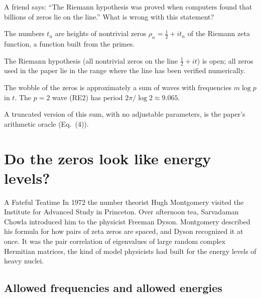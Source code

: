 \begin{checkpoint}
A friend says: ``The Riemann hypothesis was proved when computers found that billions of zeros lie on the line.'' What is wrong with this statement?
\end{checkpoint}

\begin{keyideas}
\item The numbers $t_n$ are heights of nontrivial zeros $\rho_n = \tfrac12 + i t_n$ of the Riemann zeta function, a function built from the primes.
\item The Riemann hypothesis (all nontrivial zeros on the line $\tfrac12 + i t$) is open; all zeros used in the paper lie in the range where the line has been verified numerically.
\item The wobble of the zeros is approximately a sum of waves with frequencies $m\log p$ in $t$. The $p=2$ wave (RE2) has period $2\pi/\log 2 \approx 9.065$.
\item A truncated version of this sum, with no adjustable parameters, is the paper's arithmetic oracle (Eq.~(4)).
\end{keyideas}

\section{Do the zeros look like energy levels?}\label{sec:intro-hp}
\begin{didyouknow}{A Fateful Teatime}
In 1972 the number theorist Hugh Montgomery visited the Institute for Advanced Study in Princeton. Over afternoon tea, Sarvadaman Chowla introduced him to the physicist Freeman Dyson. Montgomery described his formula for how pairs of zeta zeros are spaced, and Dyson recognized it at once. It was the pair correlation of eigenvalues of large random complex Hermitian matrices, the kind of model physicists had built for the energy levels of heavy nuclei.
\end{didyouknow}

\subsection{Allowed frequencies and allowed energies}

